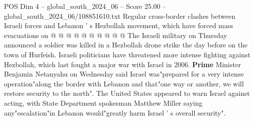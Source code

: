 \begin{textsample}{POS Dim 4 – global\_south\_2024\_06 – Score 25.00 – global\_south\_2024\_06/108851610.txt}
Regular cross-border clashes between Israeli forces and Lebanon ' s Hezbollah movement, which have forced mass evacuations on @ @ @ @ @ @ @ @ @ @ The Israeli military on Thursday announced a soldier was killed in a Hezbollah drone strike the day before on the town of Hurfeish.
Israeli politicians have threatened more intense fighting against Hezbollah, which last fought a major war with Israel in 2006. \textbf{Prime} Minister Benjamin Netanyahu on Wednesday said Israel was"prepared for a very intense operation"along the border with Lebanon and that"one way or another, we will restore security to the north".
The United States appeared to warn Israel against acting, with State Department spokesman Matthew Miller saying any"escalation"in Lebanon would"greatly harm Israel ' s overall security".

\end{textsample}
